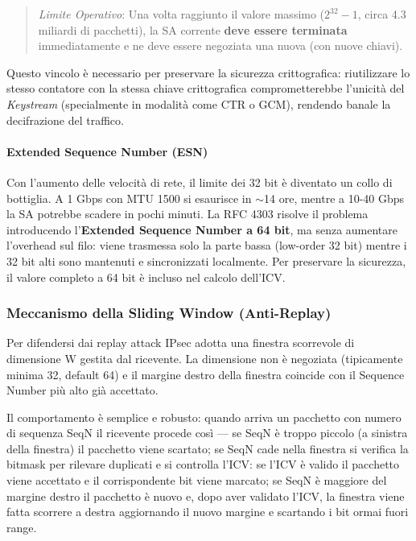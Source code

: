 \documentclass[a4paper, 11pt]{article}
\begin{document}
\begin{quote}
    \textit{Limite Operativo}: Una volta raggiunto il valore massimo ($2^{32}-1$, circa 4.3 miliardi di pacchetti), la SA corrente \textbf{deve essere terminata} immediatamente e ne deve essere negoziata una nuova (con nuove chiavi).
\end{quote}

Questo vincolo è necessario per preservare la sicurezza crittografica: riutilizzare lo stesso contatore con la stessa chiave crittografica comprometterebbe l'unicità del \textit{Keystream} (specialmente in modalità come CTR o GCM), rendendo banale la decifrazione del traffico.

\paragraph{Extended Sequence Number (ESN)}
Con l'aumento delle velocità di rete, il limite dei 32 bit è diventato un collo di bottiglia. A 1 Gbps con MTU 1500 si esaurisce in $\sim$14 ore, mentre a 10-40 Gbps la SA potrebbe scadere in pochi minuti. 
La RFC 4303 risolve il problema introducendo l'\textbf{Extended Sequence Number a 64 bit}, ma senza aumentare l'overhead sul filo: viene trasmessa solo la parte bassa (low-order 32 bit) mentre i 32 bit alti sono mantenuti e sincronizzati localmente. Per preservare la sicurezza, il valore completo a 64 bit è incluso nel calcolo dell'ICV.

\subsubsection{Meccanismo della Sliding Window (Anti-Replay)}

Per difendersi dai replay attack IPsec adotta una finestra scorrevole di dimensione W gestita dal ricevente. La dimensione non è negoziata (tipicamente minima 32, default 64) e il margine destro della finestra coincide con il Sequence Number più alto già accettato.

Il comportamento è semplice e robusto: quando arriva un pacchetto con numero di sequenza SeqN il ricevente procede così — se SeqN è troppo piccolo (a sinistra della finestra) il pacchetto viene scartato; se SeqN cade nella finestra si verifica la bitmask per rilevare duplicati e si controlla l'ICV: se l'ICV è valido il pacchetto viene accettato e il corrispondente bit viene marcato; se SeqN è maggiore del margine destro il pacchetto è nuovo e, dopo aver validato l'ICV, la finestra viene fatta scorrere a destra aggiornando il nuovo margine e scartando i bit ormai fuori range.
\end{document}
